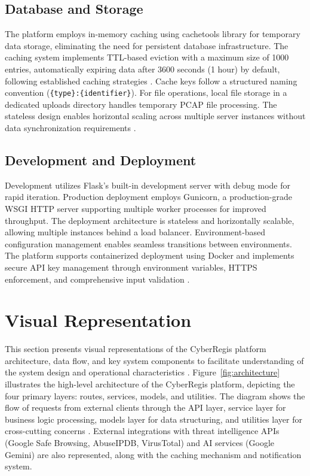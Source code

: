 \documentclass[pdflatex,sn-mathphys-num]{sn-jnl}%
\theoremstyle{thmstyleone}%
\theoremstyle{thmstyletwo}%
\theoremstyle{thmstylethree}%
\begin{document}
\subsection{Database and Storage}

The platform employs in-memory caching using cachetools library for temporary data storage, eliminating the need for persistent database infrastructure. The caching system implements TTL-based eviction with a maximum size of 1000 entries, automatically expiring data after 3600 seconds (1 hour) by default, following established caching strategies \cite{bib17,bib18}. Cache keys follow a structured naming convention (\texttt{\{type\}:\{identifier\}}). For file operations, local file storage in a dedicated uploads directory handles temporary PCAP file processing. The stateless design enables horizontal scaling across multiple server instances without data synchronization requirements \cite{bib7}.

\subsection{Development and Deployment}

Development utilizes Flask's built-in development server with debug mode for rapid iteration. Production deployment employs Gunicorn, a production-grade WSGI HTTP server supporting multiple worker processes for improved throughput. The deployment architecture is stateless and horizontally scalable, allowing multiple instances behind a load balancer. Environment-based configuration management enables seamless transitions between environments. The platform supports containerized deployment using Docker and implements secure API key management through environment variables, HTTPS enforcement, and comprehensive input validation \cite{bib9}. 

\section{Visual Representation}\label{sec4}

This section presents visual representations of the CyberRegis platform architecture, data flow, and key system components to facilitate understanding of the system design and operational characteristics \cite{bib20}. Figure~\ref{fig:architecture} illustrates the high-level architecture of the CyberRegis platform, depicting the four primary layers: routes, services, models, and utilities. The diagram shows the flow of requests from external clients through the API layer, service layer for business logic processing, models layer for data structuring, and utilities layer for cross-cutting concerns \cite{bib7}. External integrations with threat intelligence APIs (Google Safe Browsing, AbuseIPDB, VirusTotal) and AI services (Google Gemini) are also represented, along with the caching mechanism and notification system.
\end{document}
